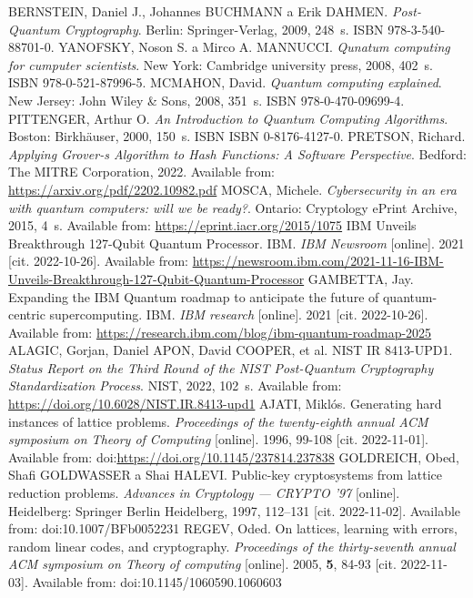 \begin{thebibliography}{99}
  BERNSTEIN, Daniel J., Johannes BUCHMANN a Erik DAHMEN. \textit{Post-Quantum Cryptography}. Berlin: Springer-Verlag, 2009, 248~s. ISBN 978-3-540-88701-0.
  YANOFSKY, Noson S. a Mirco A. MANNUCCI. \textit{Qunatum computing for cumputer scientists}. New York: Cambridge university press, 2008, 402~s. ISBN 978-0-521-87996-5.
  MCMAHON, David. \textit{Quantum computing explained}. New Jersey: John Wiley \& Sons, 2008, 351~s. ISBN 978-0-470-09699-4.
  PITTENGER, Arthur O. \textit{An Introduction to Quantum Computing Algorithms}. Boston: Birkhäuser, 2000, 150~s. ISBN ISBN 0-8176-4127-0.
  PRETSON, Richard. \textit{Applying Grover-s Algorithm to Hash Functions: A Software Perspective}. Bedford: The MITRE Corporation, 2022. Available from: \url{https://arxiv.org/pdf/2202.10982.pdf}
  MOSCA, Michele. \textit{Cybersecurity in an era with quantum computers: will we be ready?}. Ontario: Cryptology ePrint Archive, 2015, 4~s. Available from: \url{https://eprint.iacr.org/2015/1075}
  IBM Unveils Breakthrough 127-Qubit Quantum Processor. IBM. \textit{IBM Newsroom} [online]. 2021 [cit. 2022-10-26]. Available from: \url{https://newsroom.ibm.com/2021-11-16-IBM-Unveils-Breakthrough-127-Qubit-Quantum-Processor}
  GAMBETTA, Jay. Expanding the IBM Quantum roadmap to anticipate the future of quantum-centric supercomputing. IBM. \textit{IBM research} [online]. 2021 [cit. 2022-10-26]. Available from: \url{https://research.ibm.com/blog/ibm-quantum-roadmap-2025}
  ALAGIC, Gorjan, Daniel APON, David COOPER, et al. NIST IR 8413-UPD1. \textit{Status Report on the Third Round of the NIST Post-Quantum Cryptography Standardization Process}. NIST, 2022, 102~s. Available from: \url{https://doi.org/10.6028/NIST.IR.8413-upd1}
  AJATI, Miklós. Generating hard instances of lattice problems. \textit{Proceedings of the twenty-eighth annual ACM symposium on Theory of Computing} [online]. 1996, 99-108 [cit. 2022-11-01]. Available from: doi:\url{https://doi.org/10.1145/237814.237838}
  GOLDREICH, Obed, Shafi GOLDWASSER a Shai HALEVI. Public-key cryptosystems from lattice reduction problems. \textit{Advances in Cryptology --- CRYPTO '97} [online]. Heidelberg: Springer Berlin Heidelberg, 1997, 112--131 [cit. 2022-11-02]. Available from: doi:10.1007/BFb0052231
  REGEV, Oded. On lattices, learning with errors, random linear codes, and cryptography. \textit{Proceedings of the thirty-seventh annual ACM symposium on Theory of computing} [online]. 2005, \textbf{5}, 84-93 [cit. 2022-11-03]. Available from: doi:10.1145/1060590.1060603

\end{thebibliography}
